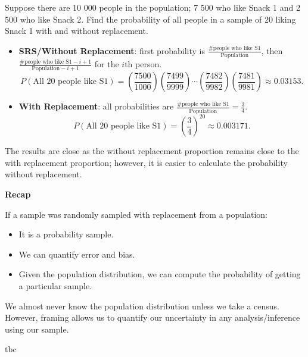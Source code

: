 \begin{example}{Suppose there are 10 000 people in the population; 7 500 who like Snack 1 and 2 500 who like Snack 2. Find the probability of all people in a sample of 20 liking Snack 1 with and without replacement.
\tcbline 
\begin{itemize}
\item \textbf{SRS/Without Replacement}: first probability is $\frac{\text{\# people who like S1}}{\text{Population}}$, then $\frac{\text{\# people who like S1}-i+1}{\text{Population}-i+1}$ for the $i$th person.
\[
P(\text{All 20 people like S1}) = \left(\frac{7500}{1000}\right) \left(\frac{7499}{9999}\right) \cdots \left(\frac{7482}{9982}\right) \left(\frac{7481}{9981}\right) \approx 0.03153   
.\] 
\item \textbf{With Replacement}: all probabilities are $\frac{\text{\# people who like S1}}{\text{Population}} = \frac{3}{4}$.
\[
P(\text{All 20 people like S1}) = \left(\frac{3}{4}\right)^{20} \approx 0.003171
.\] 
\end{itemize}
The results are close as the without replacement proportion remains close to the with replacement proportion; however, it is easier to calculate the probability without replacement.
}
\end{example}
\textbf{Recap}

If a sample was randomly sampled with replacement from a population:
\begin{itemize}
\item It is a probability sample.
\item We can quantify error and bias.
\item Given the population distribution, we can compute the probability of getting a particular sample.
\end{itemize}
\begin{notebox}[]
We almost never know the population distribution unless we take a census. However, framing allows us to quantify our uncertainty in any analysis/inference using our sample.
\end{notebox}

\begin{example}{tbc
}
\end{example}

